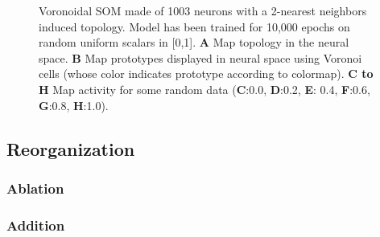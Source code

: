 \begin{figure}
  \caption{Voronoidal SOM made of 1003 neurons with a 2-nearest neighbors
    induced topology. Model has been trained for 10,000 epochs on random
    uniform scalars in [0,1]. \textbf{A} Map topology in the neural
    space. \textbf{B} Map prototypes displayed in neural space using Voronoi
    cells (whose color indicates prototype according to colormap). \textbf{C to
      H} Map activity for some random data (\textbf{C}:0.0, \textbf{D}:0.2,
    \textbf{E}: 0.4, \textbf{F}:0.6, \textbf{G}:0.8, \textbf{H}:1.0).}
\end{figure}


\subsection{Reorganization}

\subsubsection*{Ablation}

\subsubsection*{Addition}
